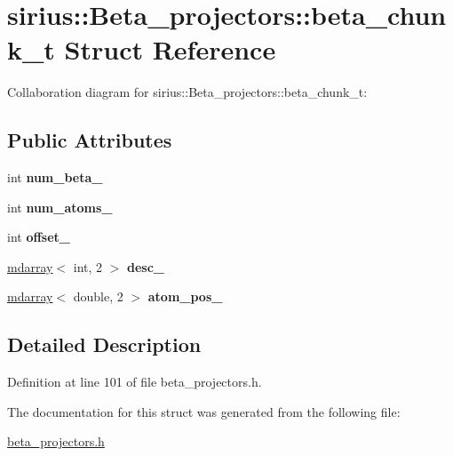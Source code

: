 \hypertarget{structsirius_1_1_beta__projectors_1_1beta__chunk__t}{}\section{sirius\+:\+:Beta\+\_\+projectors\+:\+:beta\+\_\+chunk\+\_\+t Struct Reference}
\label{structsirius_1_1_beta__projectors_1_1beta__chunk__t}


Collaboration diagram for sirius\+:\+:Beta\+\_\+projectors\+:\+:beta\+\_\+chunk\+\_\+t\+:
\subsection*{Public Attributes}
\begin{DoxyCompactItemize}
\item 
\hypertarget{structsirius_1_1_beta__projectors_1_1beta__chunk__t_ac6147177954ea0ef5ab15a18b6579edb}{}int {\bfseries num\+\_\+beta\+\_\+}\label{structsirius_1_1_beta__projectors_1_1beta__chunk__t_ac6147177954ea0ef5ab15a18b6579edb}

\item 
\hypertarget{structsirius_1_1_beta__projectors_1_1beta__chunk__t_ac6b4d381cf99b52c9781b9d92408be08}{}int {\bfseries num\+\_\+atoms\+\_\+}\label{structsirius_1_1_beta__projectors_1_1beta__chunk__t_ac6b4d381cf99b52c9781b9d92408be08}

\item 
\hypertarget{structsirius_1_1_beta__projectors_1_1beta__chunk__t_a5d3d9410d2af3e5d72abdffc837f3e29}{}int {\bfseries offset\+\_\+}\label{structsirius_1_1_beta__projectors_1_1beta__chunk__t_a5d3d9410d2af3e5d72abdffc837f3e29}

\item 
\hypertarget{structsirius_1_1_beta__projectors_1_1beta__chunk__t_a9dc4f032dd319a25c39f5907bf70eb6b}{}\hyperlink{classsddk_1_1mdarray}{mdarray}$<$ int, 2 $>$ {\bfseries desc\+\_\+}\label{structsirius_1_1_beta__projectors_1_1beta__chunk__t_a9dc4f032dd319a25c39f5907bf70eb6b}

\item 
\hypertarget{structsirius_1_1_beta__projectors_1_1beta__chunk__t_ab7a01288b6bcc4e50696a45e9bab18ee}{}\hyperlink{classsddk_1_1mdarray}{mdarray}$<$ double, 2 $>$ {\bfseries atom\+\_\+pos\+\_\+}\label{structsirius_1_1_beta__projectors_1_1beta__chunk__t_ab7a01288b6bcc4e50696a45e9bab18ee}

\end{DoxyCompactItemize}


\subsection{Detailed Description}


Definition at line 101 of file beta\+\_\+projectors.\+h.



The documentation for this struct was generated from the following file\+:\begin{DoxyCompactItemize}
\item 
\hyperlink{beta__projectors_8h}{beta\+\_\+projectors.\+h}\end{DoxyCompactItemize}
